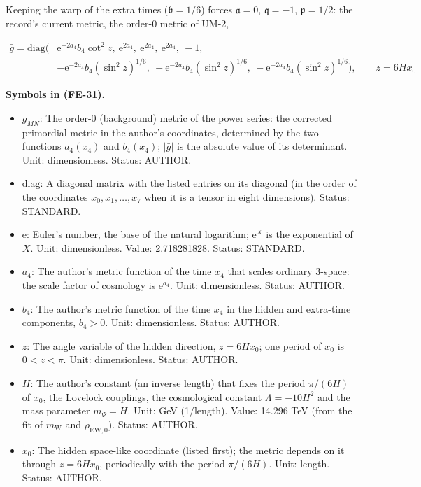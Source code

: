 \documentclass[
  10pt,
]{article}
\providecommand{\tightlist}{%
  \setlength{\itemsep}{0pt}\setlength{\parskip}{0pt}}
\begin{document}
Keeping the warp of the extra times (\(\mathfrak{b} = 1/6\)) forces
\(\mathfrak{a} = 0\), \(\mathfrak{q} = -1\), \(\mathfrak{p} = 1/2\): the
record's current metric, the order-0 metric of UM-2,

\[
\begin{aligned}
\bar g = \mathrm{diag}\Big(&\mathrm{e}^{-2a_4}b_4\cot^2z,\ \mathrm{e}^{2a_4},\ \mathrm{e}^{2a_4},\ 
 \mathrm{e}^{2a_4},\ -1,\\
&-\mathrm{e}^{-2a_4}b_4(\sin^2z)^{1/6},\ -\mathrm{e}^{-2a_4}b_4(\sin^2z)^{1/6},\ -\mathrm{e}^{-2a_4}b_4(
 \sin^2z)^{1/6}\Big),
 \qquad z = 6Hx_0
\end{aligned} \tag{FE-31}
\]

\textbf{Symbols in (FE-31).}

\begin{itemize}
\tightlist
\item
  \(\bar g_{MN}\): The order-0 (background) metric of the power series:
  the corrected primordial metric in the author's coordinates,
  determined by the two functions \(a_4(x_4)\) and \(b_4(x_4)\);
  \(\lvert\bar g\rvert\) is the absolute value of its determinant. Unit:
  dimensionless. Status: AUTHOR.
\item
  \(\mathrm{diag}\): A diagonal matrix with the listed entries on its
  diagonal (in the order of the coordinates \(x_0, x_1, \dots, x_7\)
  when it is a tensor in eight dimensions). Status: STANDARD.
\item
  \(\mathrm{e}\): Euler's number, the base of the natural logarithm;
  \(\mathrm{e}^{X}\) is the exponential of \(X\). Unit: dimensionless.
  Value: 2.718281828. Status: STANDARD.
\item
  \(a_4\): The author's metric function of the time \(x_4\) that scales
  ordinary 3-space: the scale factor of cosmology is
  \(\mathrm{e}^{a_4}\). Unit: dimensionless. Status: AUTHOR.
\item
  \(b_4\): The author's metric function of the time \(x_4\) in the
  hidden and extra-time components, \(b_4 > 0\). Unit: dimensionless.
  Status: AUTHOR.
\item
  \(z\): The angle variable of the hidden direction, \(z = 6Hx_0\); one
  period of \(x_0\) is \(0 < z < \pi\). Unit: dimensionless. Status:
  AUTHOR.
\item
  \(H\): The author's constant (an inverse length) that fixes the period
  \(\pi/(6H)\) of \(x_0\), the Lovelock couplings, the cosmological
  constant \(\Lambda = -10H^2\) and the mass parameter \(m_\Psi = H\).
  Unit: GeV (1/length). Value: 14.296 TeV (from the fit of
  \(m_{\mathrm{W}}\) and \(\rho_{\mathrm{EW},0}\)). Status: AUTHOR.
\item
  \(x_0\): The hidden space-like coordinate (listed first); the metric
  depends on it through \(z = 6Hx_0\), periodically with the period
  \(\pi/(6H)\). Unit: length. Status: AUTHOR.
\end{itemize}
\end{document}
